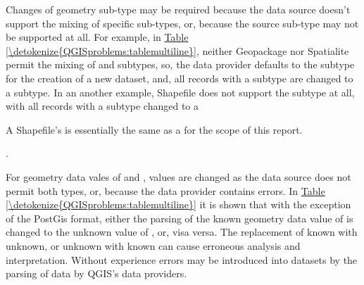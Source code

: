 \documentclass[a4paper,11pt,english]{sphinxmanual}
\begin{document}
Changes of geometry sub-type may be required because the data source doesn’t support the mixing of specific sub-types, or, because the source sub-type may not be supported at all.  For example, in \hyperref[\detokenize{QGISproblems:tablemultiline}]{Table \ref{\detokenize{QGISproblems:tablemultiline}}}, neither Geopackage nor Spatialite permit the mixing of  and  subtypes, so, the data provider defaults to the  subtype for the creation of a new dataset, and, all records with a  subtype are changed to a  subtype.  In an another example, Shapefile does not support the  subtype at all, with all records with a  subtype changed to a  %
\begin{footnote}[9]\sphinxAtStartFootnote
A Shapefile’s  is essentially the same as a  for the scope of this report.
%
\end{footnote}.

For geometry data vales of  and , values are changed as the data source does not permit both types, or, because the data provider contains errors.  In \hyperref[\detokenize{QGISproblems:tablemultiline}]{Table \ref{\detokenize{QGISproblems:tablemultiline}}} it is shown that with the exception of the PostGis format, either the parsing of the known geometry data value of  is changed to the unknown value of , or, visa versa.  The replacement of known with unknown, or unknown with known can cause erroneous analysis and interpretation.  Without experience errors may be introduced into datasets by the parsing of data by QGIS’s data providers.
\end{document}
